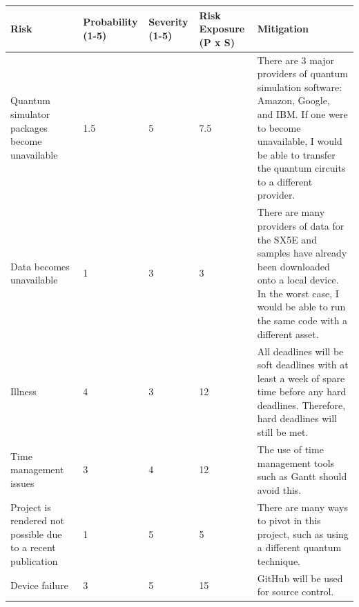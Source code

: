 \documentclass[12pt]{article}
\numberwithin{equation}{section}
\begin{document}
\begin{tabularx}{\textwidth}{|p{2.2cm}|p{2.1cm}|p{1.5cm}|p{1.9cm}|X|}
\hline
\textbf{Risk} & \textbf{Probability (1-5)} & \textbf{Severity (1-5)} & \textbf{Risk Exposure (P x S)} & \textbf{Mitigation} \\ \hline
Quantum simulator packages become unavailable & 1.5 & 5 & 7.5 & There are 3 major providers of quantum simulation software: Amazon, Google, and IBM. If one were to become unavailable, I would be able to transfer the quantum circuits to a different provider. \\ \hline
Data becomes unavailable & 1 & 3 & 3 & There are many providers of data for the SX5E and samples have already been downloaded onto a local device. In the worst case, I would be able to run the same code with a different asset. \\ \hline
Illness & 4 & 3 & 12 & All deadlines will be soft deadlines with at least a week of spare time before any hard deadlines. Therefore, hard deadlines will still be met. \\ \hline
Time management issues & 3 & 4 & 12 & The use of time management tools such as Gantt should avoid this. \\ \hline
Project is rendered not possible due to a recent publication & 1 & 5 & 5 & There are many ways to pivot in this project, such as using a different quantum technique. \\ \hline
Device failure & 3 & 5 & 15 & GitHub will be used for source control. \\ \hline
\end{tabularx}
\clearpage

\printbibliography
\end{document}
